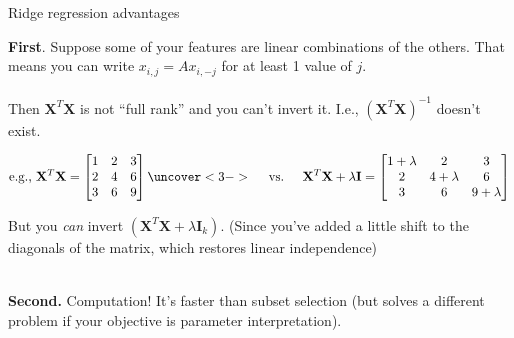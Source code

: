 \documentclass[mathserif, aspectratio=169]{beamer}
\begin{document}
\begin{frame}{Ridge regression advantages}

\pause

\textbf{First}.  Suppose some of your features are linear combinations of the others.  That means you can write $x_{i,j} = Ax_{i,-j}$ for at least 1 value of $j$. \\~\\

Then $\mathbf{X}^T\mathbf{X}$ is not ``full rank'' and you can't invert it.  I.e., $(\mathbf{X}^T\mathbf{X})^{-1}$ doesn't exist.

\begin{align*}
\text{e.g., }\mathbf{X}^T\mathbf{X} = 
\begin{bmatrix}
1 & 2 & 3\\
2 & 4 & 6\\
3 & 6 & 9
\end{bmatrix}
\uncover<3->{\text{ \quad vs.  \quad}
\mathbf{X}^T\mathbf{X} + \lambda \mathbf{I} =
\begin{bmatrix}
1+\lambda & 2 & 3\\
2 & 4+\lambda & 6\\
3 & 6 & 9+\lambda
\end{bmatrix} }
\end{align*}

\pause

But you \textit{can} invert $\left(\mathbf{X}^T\mathbf{X} + \lambda\mathbf{I}_k\right)$.  (Since you've added a little shift to the diagonals of the matrix, which restores linear independence)\\~\\



\pause

\textbf{Second.}  Computation!  It's faster than subset selection (but solves a different problem if your objective is parameter interpretation).

\end{frame}
\end{document}
